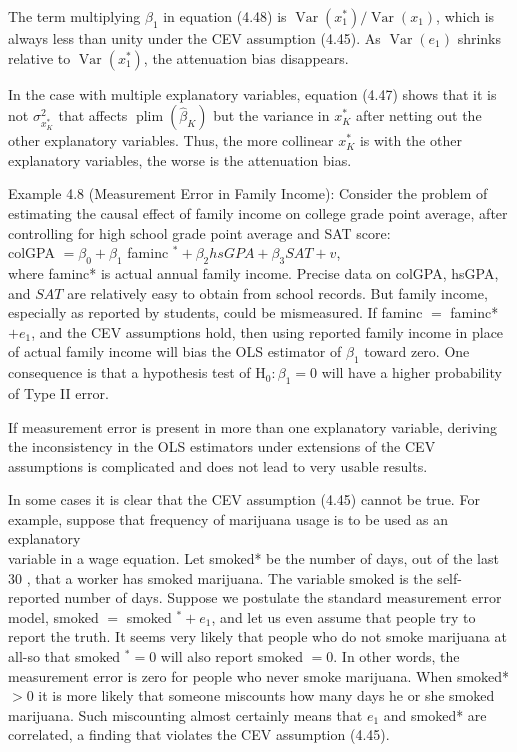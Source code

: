 \documentclass[10pt]{article}
\begin{document}
The term multiplying $\beta_{1}$ in equation (4.48) is $\operatorname{Var}\left(x_{1}^{*}\right) / \operatorname{Var}\left(x_{1}\right)$, which is always less than unity under the CEV assumption (4.45). As $\operatorname{Var}\left(e_{1}\right)$ shrinks relative to $\operatorname{Var}\left(x_{1}^{*}\right)$, the attenuation bias disappears.

In the case with multiple explanatory variables, equation (4.47) shows that it is not $\sigma_{x_{K}^{*}}^{2}$ that affects $\operatorname{plim}\left(\hat{\beta}_{K}\right)$ but the variance in $x_{K}^{*}$ after netting out the other explanatory variables. Thus, the more collinear $x_{K}^{*}$ is with the other explanatory variables, the worse is the attenuation bias.

Example 4.8 (Measurement Error in Family Income): Consider the problem of estimating the causal effect of family income on college grade point average, after controlling for high school grade point average and SAT score:\\
colGPA $=\beta_{0}+\beta_{1}$ faminc $^{*}+\beta_{2} h s G P A+\beta_{3} S A T+v$,\\
where faminc* is actual annual family income. Precise data on colGPA, hsGPA, and $S A T$ are relatively easy to obtain from school records. But family income, especially as reported by students, could be mismeasured. If faminc $=$ faminc* $+e_{1}$, and the CEV assumptions hold, then using reported family income in place of actual family income will bias the OLS estimator of $\beta_{1}$ toward zero. One consequence is that a hypothesis test of $\mathrm{H}_{0}: \beta_{1}=0$ will have a higher probability of Type II error.

If measurement error is present in more than one explanatory variable, deriving the inconsistency in the OLS estimators under extensions of the CEV assumptions is complicated and does not lead to very usable results.

In some cases it is clear that the CEV assumption (4.45) cannot be true. For example, suppose that frequency of marijuana usage is to be used as an explanatory\\
variable in a wage equation. Let smoked* be the number of days, out of the last 30 , that a worker has smoked marijuana. The variable smoked is the self-reported number of days. Suppose we postulate the standard measurement error model, smoked $=$ smoked ${ }^{*}+e_{1}$, and let us even assume that people try to report the truth. It seems very likely that people who do not smoke marijuana at all-so that smoked ${ }^{*}=0$ will also report smoked $=0$. In other words, the measurement error is zero for people who never smoke marijuana. When smoked* $>0$ it is more likely that someone miscounts how many days he or she smoked marijuana. Such miscounting almost certainly means that $e_{1}$ and smoked* are correlated, a finding that violates the CEV assumption (4.45).
\end{document}
